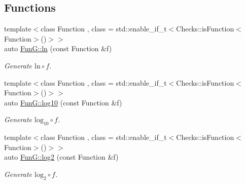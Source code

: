\subsection*{\-Functions}
\begin{DoxyCompactItemize}
\item 
{\footnotesize template$<$class Function , class  = std\-::enable\-\_\-if\-\_\-t$<$\-Checks\-::is\-Function$<$\-Function$>$()$>$$>$ }\\auto \hyperlink{group__CMathGroup_ga31313571b08f65b853643e14fc8fc714}{\-Fun\-G\-::ln} (const \-Function \&f)
\begin{DoxyCompactList}\small\item\em \-Generate $ \mathrm{ln}\circ f $. \end{DoxyCompactList}\item 
{\footnotesize template$<$class Function , class  = std\-::enable\-\_\-if\-\_\-t$<$\-Checks\-::is\-Function$<$\-Function$>$()$>$$>$ }\\auto \hyperlink{group__CMathGroup_gae9506f4e0e6fad4f756f636044697bfe}{\-Fun\-G\-::log10} (const \-Function \&f)
\begin{DoxyCompactList}\small\item\em \-Generate $ \mathrm{log}_{10}\circ f $. \end{DoxyCompactList}\item 
{\footnotesize template$<$class Function , class  = std\-::enable\-\_\-if\-\_\-t$<$\-Checks\-::is\-Function$<$\-Function$>$()$>$$>$ }\\auto \hyperlink{group__CMathGroup_gacd6be7e9de7bbd54c852f0acf0c7d2c2}{\-Fun\-G\-::log2} (const \-Function \&f)
\begin{DoxyCompactList}\small\item\em \-Generate $ \mathrm{log}_{2}\circ f $. \end{DoxyCompactList}\end{DoxyCompactItemize}
